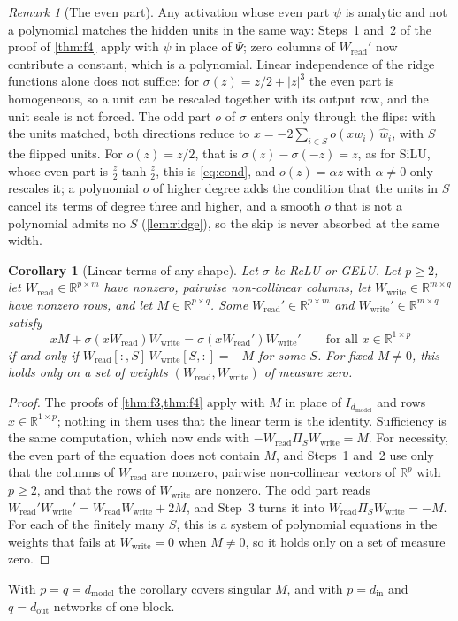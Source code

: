\documentclass[10pt]{article}
\newtheorem{corollary}[theorem]{Corollary}
\theoremstyle{definition}
\theoremstyle{remark}
\newtheorem{remark}[theorem]{Remark}
\newcommand{\R}{\mathbb{R}}
\newcommand{\Wread}{W_{\mathrm{read}}}
\newcommand{\Wwrite}{W_{\mathrm{write}}}
\newcommand{\dm}{d_{\mathrm{model}}}
\begin{document}
\begin{remark}[The even part]\label{rem:evenpart}
Any activation whose even part $\psi$ is analytic and not a polynomial matches the hidden units in the same way: Steps~1 and~2 of the proof of \cref{thm:f4} apply with $\psi$ in place of $\Psi$; zero columns of $\Wread'$ now contribute a constant, which is a polynomial. Linear independence of the ridge functions alone does not suffice: for $\sigma(z) = z/2 + \lvert z\rvert^3$ the even part is homogeneous, so a unit can be rescaled together with its output row, and the unit scale is not forced. The odd part $o$ of $\sigma$ enters only through the flips: with the units matched, both directions reduce to $x = -2\sum_{i \in S} o(xw_i)\,\hat w_i$, with $S$ the flipped units. For $o(z) = z/2$, that is $\sigma(z) - \sigma(-z) = z$, as for SiLU, whose even part is $\tfrac z2\tanh\tfrac z2$, this is \eqref{eq:cond}, and $o(z) = \alpha z$ with $\alpha \neq 0$ only rescales it; a polynomial $o$ of higher degree adds the condition that the units in $S$ cancel its terms of degree three and higher, and a smooth $o$ that is not a polynomial admits no $S$ (\cref{lem:ridge}), so the skip is never absorbed at the same width.
\end{remark}

\begin{corollary}[Linear terms of any shape]\label{cor:anyM}
Let $\sigma$ be ReLU or GELU. Let $p \ge 2$, let $\Wread \in \R^{p\times m}$ have nonzero, pairwise non-collinear columns, let $\Wwrite \in \R^{m\times q}$ have nonzero rows, and let $M \in \R^{p\times q}$. Some $\Wread' \in \R^{p\times m}$ and $\Wwrite' \in \R^{m\times q}$ satisfy
\[
xM + \sigma(x\Wread)\Wwrite = \sigma(x\Wread')\Wwrite' \qquad\text{for all } x \in \R^{1\times p}
\]
if and only if $\Wread[{:},S]\,\Wwrite[S,{:}] = -M$ for some $S$. For fixed $M \neq 0$, this holds only on a set of weights $(\Wread, \Wwrite)$ of measure zero.
\end{corollary}
\begin{proof}
The proofs of \cref{thm:f3,thm:f4} apply with $M$ in place of $I_{\dm}$ and rows $x \in \R^{1\times p}$; nothing in them uses that the linear term is the identity. Sufficiency is the same computation, which now ends with $-\Wread\Pi_S\Wwrite = M$. For necessity, the even part of the equation does not contain $M$, and Steps~1 and~2 use only that the columns of $\Wread$ are nonzero, pairwise non-collinear vectors of $\R^p$ with $p \ge 2$, and that the rows of $\Wwrite$ are nonzero. The odd part reads $\Wread'\Wwrite' = \Wread\Wwrite + 2M$, and Step~3 turns it into $\Wread\Pi_S\Wwrite = -M$. For each of the finitely many $S$, this is a system of polynomial equations in the weights that fails at $\Wwrite = 0$ when $M \neq 0$, so it holds only on a set of measure zero.
\end{proof}
With $p = q = \dm$ the corollary covers singular $M$, and with $p = d_{\mathrm{in}}$ and $q = d_{\mathrm{out}}$ networks of one block.
\end{document}
